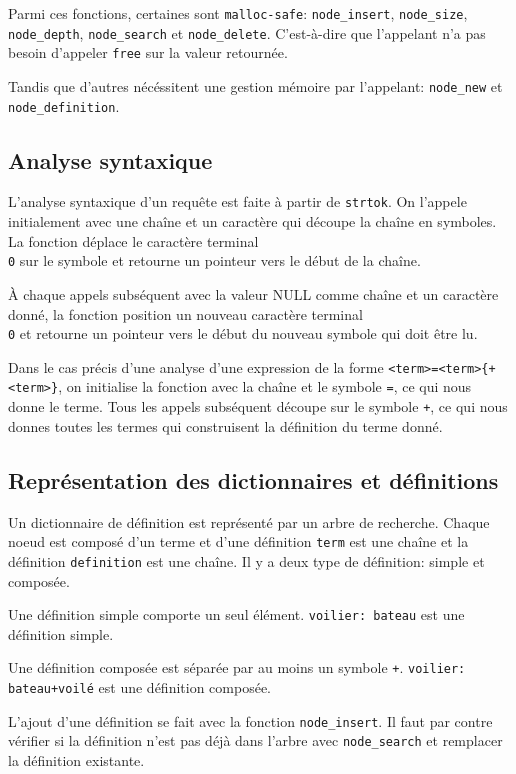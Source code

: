 \documentclass{article}
\begin{document}
Parmi ces fonctions, certaines sont \texttt{malloc-safe}: \texttt{node\_insert},
\texttt{node\_size}, \texttt{node\_depth}, \texttt{node\_search} et
\texttt{node\_delete}. C'est-à-dire que l'appelant n'a pas
besoin d'appeler \texttt{free} sur la valeur retournée.

Tandis que d'autres nécéssitent une gestion mémoire par l'appelant:
\texttt{node\_new} et \texttt{node\_definition}.

\subsection{Analyse syntaxique}
L'analyse syntaxique d'un requête est faite à partir de \texttt{strtok}. On
l'appele initialement avec une chaîne et un caractère qui découpe la chaîne en
symboles. La fonction déplace le caractère terminal \texttt{\\0} sur le symbole
et retourne un pointeur vers le début de la chaîne.

À chaque appels subséquent avec la valeur NULL comme chaîne et un caractère
donné, la fonction position un nouveau caractère terminal \texttt{\\0} et
retourne un pointeur vers le début du nouveau symbole qui doit être lu.

Dans le cas précis d'une analyse d'une expression de la forme
\texttt{<term>=<term>\{+<term>\}}, on initialise la fonction avec la
chaîne et le symbole \texttt{=}, ce qui nous donne le terme. Tous les appels
subséquent découpe sur le symbole \texttt{+}, ce qui nous donnes toutes les
termes qui construisent la définition du terme donné.

\subsection{Représentation des dictionnaires et définitions}
Un dictionnaire de définition est représenté par un arbre de recherche. Chaque
noeud est composé d'un terme et d'une définition \texttt{term} est une chaîne et
la définition \texttt{definition} est une chaîne. Il y a deux type de
définition: simple et composée.

Une définition simple comporte un seul élément. \texttt{voilier: bateau} est une
définition simple.

Une définition composée est séparée par au moins un symbole \texttt{+}.
\texttt{voilier: bateau+voilé} est une définition composée.

L'ajout d'une définition se fait avec la fonction \texttt{node\_insert}. Il faut
par contre vérifier si la définition n'est pas déjà dans l'arbre avec
\texttt{node\_search} et remplacer la définition existante.
\end{document}
